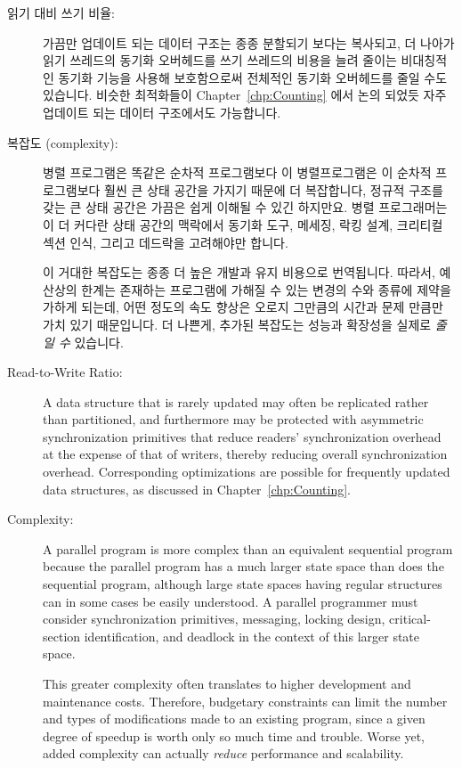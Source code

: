 \begin{description}
\fi

\item[읽기 대비 쓰기 비율:] 가끔만 업데이트 되는 데이터 구조는 종종 분할되기
	보다는 복사되고, 더 나아가 읽기 쓰레드의 동기화 오버헤드를 쓰기
	쓰레드의 비용을 늘려 줄이는 비대칭적인 동기화 기능을 사용해
	보호함으로써 전체적인 동기화 오버헤드를 줄일 수도 있습니다.
	비슷한 최적화들이 Chapter~\ref{chp:Counting} 에서 논의 되었듯 자주
	업데이트 되는 데이터 구조에서도 가능합니다.
\item[복잡도 (complexity):]  병렬 프로그램은 똑같은 순차적 프로그램보다 이
	병렬프로그램은 이 순차적 프로그램보다 훨씬 큰 상태 공간을 가지기 때문에
	더 복잡합니다, 정규적 구조를 갖는 큰 상태 공간은 가끔은 쉽게 이해될 수
	있긴 하지만요.
	병렬 프로그래머는 이 더 커다란 상태 공간의 맥락에서 동기화 도구,
	메세징, 락킹 설계, 크리티컬 섹션 인식, 그리고 데드락을 고려해야만
	합니다.

	이 거대한 복잡도는 종종 더 높은 개발과 유지 비용으로 번역됩니다.
	따라서, 예산상의 한계는 존재하는 프로그램에 가해질 수 있는 변경의 수와
	종류에 제약을 가하게 되는데, 어떤 정도의 속도 향상은 오로지 그만큼의
	시간과 문제 만큼만 가치 있기 때문입니다.
	더 나쁜게, 추가된 복잡도는 성능과 확장성을 실제로 \emph{줄일 수}
	있습니다.

\iffalse

\item[Read-to-Write Ratio:]  A data structure that is
	rarely updated may often be replicated rather than partitioned,
	and furthermore may be protected with asymmetric
	synchronization primitives that reduce readers' synchronization
	overhead at the expense of that of writers, thereby
	reducing overall synchronization overhead.
	Corresponding optimizations are possible for frequently
	updated data structures, as discussed in
	Chapter~\ref{chp:Counting}.
\item[Complexity:]  A parallel program is more complex than
	an equivalent sequential program because the parallel program
	has a much larger state space than does the sequential program,
	although large state spaces having regular structures can in
	some cases be easily understood.
	A parallel programmer must
	consider synchronization primitives, messaging, locking design,
	critical-section identification,
	and deadlock in the context of this larger state space.

	This greater complexity often translates
	to higher development and maintenance costs.
	Therefore, budgetary constraints can
	limit the number and types of modifications made to
	an existing program, since a given degree of speedup is
	worth only so much time and trouble.
	Worse yet, added complexity can actually \emph{reduce}
	performance and scalability.


\end{description}

